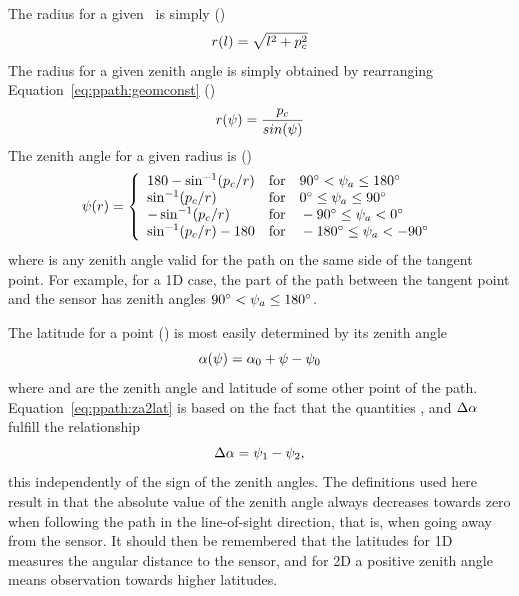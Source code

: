 The radius for a given \PpathLng\ is simply ()
\begin{equation}
  r(l) = \sqrt{l^2+p_c^2} 
  \label{eq:ppath:l2r}
\end{equation}
The radius for a given zenith angle is simply obtained by rearranging 
Equation~\ref{eq:ppath:geomconst} ()
\begin{equation}
  r(\psi) = \frac{p_c}{sin(\psi)}
  \label{eq:ppath:za2r}
\end{equation}
The zenith angle for a given radius is ()
\begin{equation}
  \psi(r) = \left\{
   \begin{array}{ll}
    180 - \sin^{-1}(p_c/r) & 
                   \textrm{for}\quad 90^\circ < \psi_{a} \leq 180^\circ\\
    \sin^{-1}(p_c/r) & 
                   \textrm{for}\quad 0^\circ \leq \psi_{a} \leq 90^\circ\\
    -\sin^{-1}(p_c/r) & 
                   \textrm{for}\quad -90^\circ \leq \psi_{a} < 0^\circ\\
    \sin^{-1}(p_c/r) - 180 & 
                  \textrm{for}\quad -180^\circ \leq \psi_{a} < -90^\circ\\
   \end{array}   \right.
  \label{eq:ppath:r2psi}
\end{equation}
where  is any zenith angle valid for the path on the same
side of the tangent point. For example, for a 1D case, the part of the
path between the tangent point and the sensor has zenith angles
$90^\circ < \psi_{a} \leq 180^\circ$.

The latitude for a point () is most 
easily determined by its zenith angle \\

\begin{equation}
  \alpha(\psi) = \alpha_{0} + \psi - \psi_{0} 
  \label{eq:ppath:za2lat}
\end{equation}
where  and  are the zenith angle and latitude of some 
other point of the path. Equation~\ref{eq:ppath:za2lat} is based on the 
fact that the quantities ,  and $\Delta\alpha$
fulfill the relationship
\begin{equation}
  \Delta\alpha = \psi_{1} - \psi_{2},
  \label{eq:ppath:dlat}
\end{equation}
this independently of the sign of the zenith angles. The definitions
used here result in that the absolute value of the zenith angle always
decreases towards zero when following the path in the line-of-sight
direction, that is, when going away from the sensor. It should then be
remembered that the latitudes for 1D measures the angular distance to
the sensor, and for 2D a positive zenith angle means observation
towards higher latitudes.

